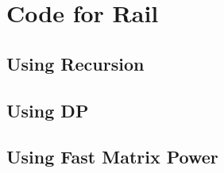 \section{Code for Rail}
\label{Rail Code}
\subsection{Using Recursion}

\subsection{Using DP}

\subsection{Using Fast Matrix Power}
